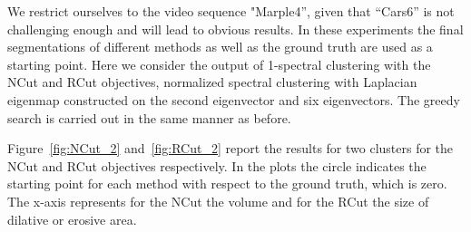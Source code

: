 We restrict ourselves to the video sequence "Marple4'', given that ``Cars6'' is not challenging enough and will lead to obvious results.
In these experiments the final segmentations of different methods as well as the ground truth are used as a starting point.
Here we consider the output of 1-spectral clustering with the NCut and RCut objectives, normalized spectral clustering with Laplacian eigenmap constructed on the second eigenvector and
six eigenvectors. The greedy search is carried out in the same manner as before.

Figure~\ref{fig:NCut_2} and~\ref{fig:RCut_2} report the results for two clusters for the NCut and RCut objectives respectively. In the plots the circle indicates
the starting point for each method with respect to the ground truth, which is zero. 
The x-axis represents for the NCut the volume  and for the RCut the size of dilative or erosive area. 
